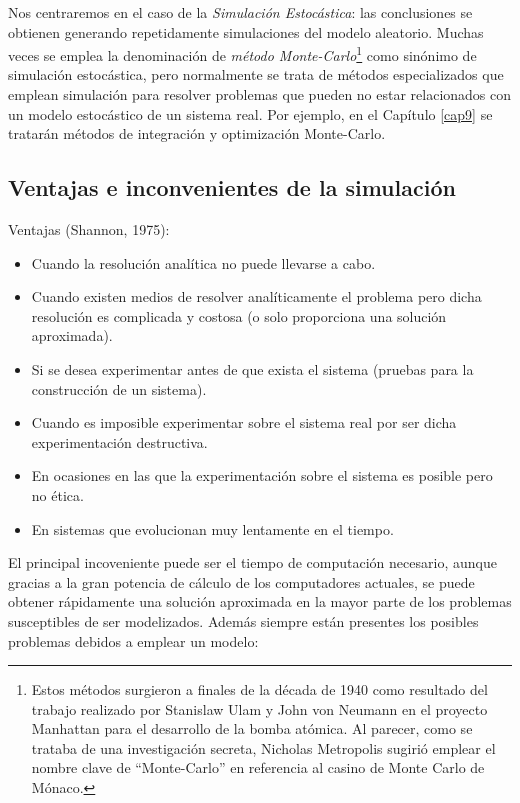 \documentclass[
]{book}
\theoremstyle{break}
\theoremstyle{definition}
\theoremstyle{definition}
\theoremstyle{definition}
\theoremstyle{remark}
\begin{document}
Nos centraremos en el caso de la \emph{Simulación Estocástica}: las conclusiones se obtienen generando repetidamente simulaciones del modelo aleatorio.
Muchas veces se emplea la denominación de \emph{método Monte-Carlo}\footnote{Estos métodos surgieron a finales de la década de 1940 como resultado del trabajo realizado por Stanislaw Ulam y John von Neumann en el proyecto Manhattan para el desarrollo de la bomba atómica. Al parecer, como se trataba de una investigación secreta, Nicholas Metropolis sugirió emplear el nombre clave de ``Monte-Carlo'' en referencia al casino de Monte Carlo de Mónaco.} como sinónimo de simulación estocástica, pero normalmente se trata de métodos especializados que emplean simulación para resolver problemas que pueden no estar relacionados con un modelo estocástico de un sistema real. Por ejemplo, en el Capítulo \ref{cap9} se tratarán métodos de integración y optimización Monte-Carlo.

\hypertarget{ventajas-e-inconvenientes-de-la-simulaciuxf3n}{%
\subsection{Ventajas e inconvenientes de la simulación}\label{ventajas-e-inconvenientes-de-la-simulaciuxf3n}}

Ventajas (Shannon, 1975):

\begin{itemize}
\item
  Cuando la resolución analítica no puede llevarse a cabo.
\item
  Cuando existen medios de resolver analíticamente el problema
  pero dicha resolución es complicada y costosa
  (o solo proporciona una solución aproximada).
\item
  Si se desea experimentar antes de que exista el sistema
  (pruebas para la construcción de un sistema).
\item
  Cuando es imposible experimentar sobre el sistema real
  por ser dicha experimentación destructiva.
\item
  En ocasiones en las que la experimentación sobre el sistema es
  posible pero no ética.
\item
  En sistemas que evolucionan muy lentamente en el tiempo.
\end{itemize}

El principal incoveniente puede ser el tiempo de computación necesario, aunque gracias a la gran potencia de cálculo de los computadores actuales, se puede obtener rápidamente una solución aproximada en la mayor parte de los problemas susceptibles de ser modelizados.
Además siempre están presentes los posibles problemas debidos a emplear un modelo:
\end{document}
